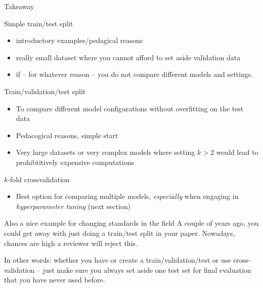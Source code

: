 \documentclass[compress]{beamer}
\begin{document}
\begin{frame}[allowframebreaks]{Takeaway}

\begin{block}{Simple train/test split}
\begin{itemize}
	\item introductory examples/pedagical reasons
	\item really small dataset where you cannot afford to set aside validation data
	\item if -- for whatever reason -- you do not compare different models and settings.
\end{itemize}
\end{block}

\framebreak

\begin{block}{Train/validation/test split}
	\begin{itemize}
		\item To compare different model configurations without overfitting on the test data
		\item Pedacogical reasons, simple start
		\item Very large datasets or very complex models where setting $k>2$ would lead to prohibtitively expensive computations
	\end{itemize}
\end{block}

\framebreak

\begin{block}{$k$-fold crossvalidation}
	\begin{itemize}
		\item Best option for comparing multiple models, \emph{especially} when engaging in \emph{hyperparameter tuning} (next section)
	\end{itemize}
\end{block}

\framebreak


\begin{alertblock}{Also a nice example for changing standards in the field}
A couple of years ago, you could get away with just doing a train/test split in your paper. Nowadays, chances are high a reviewer will reject this.
\end{alertblock}


\end{frame}



\begin{frame}[standout]
In other words: whether you have or create a train/validation/test or use cross-validation -- just make sure you always set aside one test set for final evaluation that you have never used before.
\end{frame}
\end{document}
